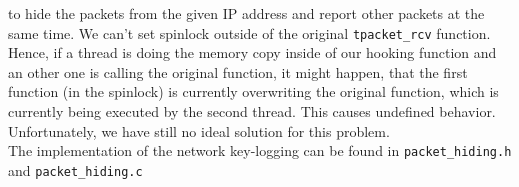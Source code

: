 to hide the packets from the given IP address and report other packets at the
same time. We can't set spinlock outside of the original \texttt{tpacket\_rcv} function. Hence, if a thread is doing the memory copy inside of our hooking function and an other one is calling the original function, it might happen, that the first function (in the spinlock) is currently overwriting the original function, which is currently being executed by the second thread. This causes undefined behavior. 
Unfortunately, we have still no ideal solution for this problem.
\\
The implementation of the network key-logging can be found in 
\verb+packet_hiding.h+ and \verb+packet_hiding.c+\\ 
